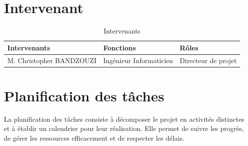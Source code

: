 \section{Intervenant}

\begin{table}[htbp]
  \centering
  \begin{tabularx}{\textwidth}{|l|l|X|}
    \hline
    \textbf{Intervenants} & \textbf{Fonctions} & \textbf{Rôles} \\ \hline
    M. Christopher BANDZOUZI & Ingénieur Informaticien & Directeur de projet  \\ \hline
  \end{tabularx}
  \caption{Intervenants}
\end{table}

\section{Planification des tâches}
La planification des tâches consiste à décomposer le projet en activités
distinctes et à établir un calendrier pour leur réalisation. Elle permet de
suivre les progrès, de gérer les ressources efficacement et de
respecter les délais.

